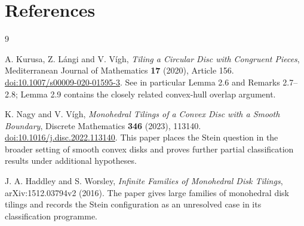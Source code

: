 \documentclass[10.5pt]{article}
\theoremstyle{remark}
\begin{document}
\section*{References}
\begin{thebibliography}{9}

A. Kurusa, Z. L\'angi and V. V\'igh,
\emph{Tiling a Circular Disc with Congruent Pieces},
Mediterranean Journal of Mathematics \textbf{17} (2020), Article 156.
\href{https://doi.org/10.1007/s00009-020-01595-3}{doi:10.1007/s00009-020-01595-3}.
See in particular Lemma 2.6 and Remarks 2.7--2.8; Lemma 2.9 contains the closely related convex-hull overlap argument.

K. Nagy and V. V\'igh,
\emph{Monohedral Tilings of a Convex Disc with a Smooth Boundary},
Discrete Mathematics \textbf{346} (2023), 113140.
\href{https://doi.org/10.1016/j.disc.2022.113140}{doi:10.1016/j.disc.2022.113140}.
This paper places the Stein question in the broader setting of smooth convex disks and proves further partial classification results under additional hypotheses.

J. A. Haddley and S. Worsley,
\emph{Infinite Families of Monohedral Disk Tilings},
arXiv:1512.03794v2 (2016).
The paper gives large families of monohedral disk tilings and records the Stein configuration as an unresolved case in its classification programme.

\end{thebibliography}
\end{document}
